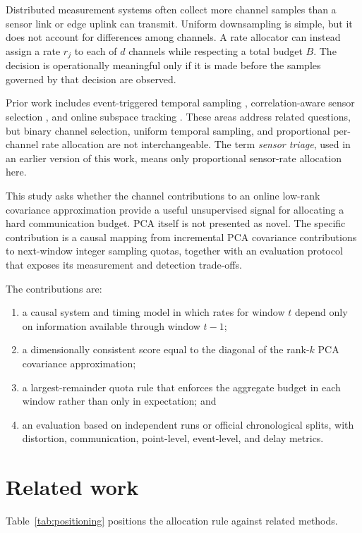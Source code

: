 \documentclass[pdflatex,sn-vancouver-num]{sn-jnl}
\theoremstyle{thmstyleone}
\begin{document}
Distributed measurement systems often collect more channel samples than a
sensor link or edge uplink can transmit. Uniform downsampling is simple, but it
does not account for differences among channels. A rate allocator can instead
assign a rate $r_j$ to each of $d$ channels while respecting a total budget
$B$. The decision is operationally meaningful only if it is made before the
samples governed by that decision are observed.

Prior work includes event-triggered temporal sampling
\cite{miskowicz2006send,gupta2018sbl}, correlation-aware sensor
selection \cite{bacciu2016unsupervised,ghosh2021adaptive}, and online subspace
tracking \cite{weng2003ccipca,balzano2010grouse,yang2018historypca}. These
areas address related questions, but binary channel selection, uniform temporal
sampling, and proportional per-channel rate allocation are not interchangeable.
The term \emph{sensor triage}, used in an earlier version of this work, means
only proportional sensor-rate allocation here.

This study asks whether the channel contributions to an online low-rank
covariance approximation provide a useful unsupervised signal for allocating a
hard communication budget. PCA itself is not presented as novel. The specific
contribution is a causal mapping from incremental PCA covariance contributions
to next-window integer sampling quotas, together with an evaluation protocol
that exposes its measurement and detection trade-offs.

The contributions are:
\begin{enumerate}[leftmargin=*]
\item a causal system and timing model in which rates for window $t$ depend only
on information available through window $t-1$;
\item a dimensionally consistent score equal to the diagonal of the rank-$k$
PCA covariance approximation;
\item a largest-remainder quota rule that enforces the aggregate budget in each
window rather than only in expectation; and
\item an evaluation based on independent runs or official chronological splits,
with distortion, communication, point-level, event-level, and delay metrics.
\end{enumerate}

\section{Related work}
Table~\ref{tab:positioning} positions the allocation rule against related methods.
\end{document}
